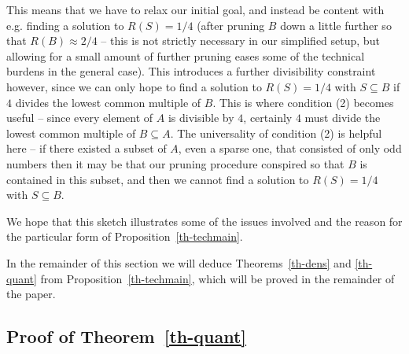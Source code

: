 \documentclass[12pt]{amsart}
\begin{document}
This means that we have to relax our initial goal, and instead be content with e.g. finding a solution to $R(S)=1/4$ (after pruning $B$ down a little further so that $R(B)\approx 2/4$ -- this is not strictly necessary in our simplified setup, but allowing for a small amount of further pruning eases some of the technical burdens in the general case). This introduces a further divisibility constraint however, since we can only hope to find a solution to $R(S)=1/4$ with $S\subseteq B$ if $4$ divides the lowest common multiple of $B$. This is where condition (2) becomes useful -- since every element of $A$ is divisible by $4$, certainly $4$ must divide the lowest common multiple of $B\subseteq A$. The universality of condition (2) is helpful here -- if there existed a subset of $A$, even a sparse one, that consisted of only odd numbers then it may be that our pruning procedure conspired so that $B$ is contained in this subset, and then we cannot find a solution to $R(S)=1/4$ with $S\subseteq B$. 

We hope that this sketch illustrates some of the issues involved and the reason for the particular form of Proposition~\ref{th-techmain}. 

In the remainder of this section we will deduce Theorems~\ref{th-dens} and \ref{th-quant} from Proposition~\ref{th-techmain}, which will be proved in the remainder of the paper.

\subsection{Proof of Theorem~\ref{th-quant}}
\end{document}
